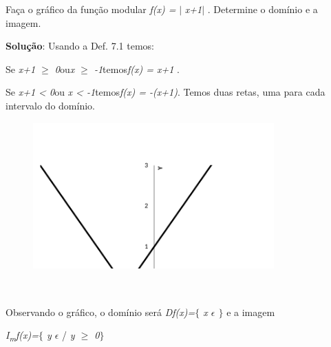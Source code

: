 \begin{texemplo}

Faça o gráfico da função modular \textit{f(x) =} $ \vert $ \textit{x+1}$ \vert $ . Determine o domínio e a imagem.  

\textbf{Solução}: Usando a Def. 7.1 temos:

\quad Se \textit{x+1 $ \geq $  0}ou\textit{x $ \geq $ -1}temos\textit{f(x) = x+1 }.

\quad Se \textit{x+1 < 0}ou\textit{ x < -1}temos\textit{f(x) = -(x+1)}. Temos duas retas, uma para cada intervalo do domínio.

\begin{figure}[H]
	\begin{Center}
		\includegraphics[width=3.65in,height=2.23in]{capitulos/outras_funcoes/media/image31.pdf}
	\end{Center}
\end{figure}

~~

\quad Observando o gráfico, o domínio será   \textit{Df(x)=$ \{ $ x $ \epsilon $  \textbf{ }$ \} $ } e a imagem

\quad \textit{I\textsubscript{m}f(x)=$ \{ $ y $ \epsilon $  }/ \textit{y $ \geq $  0$ \} $ } \qedsymbol{}
\end{texemplo}

